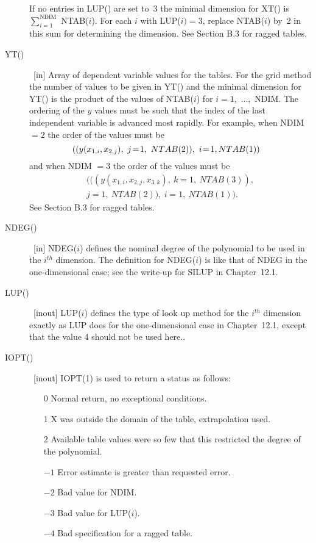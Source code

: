 \documentclass[twoside]{MATH77}
\begin{document}
\begin{description}
If no entries in LUP() are set to~3 the minimal dimension for XT() is
$\sum _{i=1}^{\text{NDIM}}$ NTAB($i$). For each $i$ with LUP($i)=3$,
replace NTAB($i$) by~2 in this sum for determining the dimension. See Section
B.3 for ragged tables.
\item[YT()]  \ [in] Array of dependent variable values for the tables. For
the grid method the number of values to be given in YT() and the minimal
dimension for YT() is the product of the values of NTAB($i$) for $i=1$,\ ...,\
NDIM. The ordering of the $y$ values must be such that the index of the last
independent variable is advanced most rapidly. For example, when NDIM $=2$
the order of the values must be%
\begin{equation*}
\hspace{-10pt}((y(x_{1,i},x_{2,j}),\ j\!=\!1,\ NTAB(2)),\ i\!=\!1,NTAB(1))
\end{equation*}
and when NDIM $=3$ the order of the values must be%
\begin{multline*}
(((y(x_{1,i},x_{2,j},x_{3,k}),\ k=1,\ NTAB(3)),\\
j=1,\ NTAB(2)),\ i=1,\ NTAB(1)).
\end{multline*}
See Section B.3 for ragged tables.
\item[NDEG()]  \ [in] NDEG($i$) defines the nominal degree of the polynomial
to be used in the $i^{th}$ dimension. The definition for NDEG($i$) is like
that of NDEG in the one-dimensional case; see the write-up for SILUP
in Chapter~12.1.
\item[LUP()]  \ [inout] LUP($i$) defines the type of look up method for the $%
i^{th}$ dimension exactly as LUP does for the one-dimensional case in
Chapter~12.1, except that the value 4 should not be used here..
\item[IOPT()]  \ [inout] IOPT(1) is used to return a status as follows:
\begin{itemize}
\item[0]  Normal return, no exceptional conditions.
\item[1]  X was outside the domain of the table, extrapolation used.
\item[2]  Available table values were so few that this restricted the degree
of the polynomial.
\item[$-1$]  Error estimate is greater than requested error.
\item[$-2$]  Bad value for NDIM.
\item[$-3$]  Bad value for LUP($i$).
\item[$-4$]  Bad specification for a ragged table.

\end{itemize}
\end{description}
\end{document}
